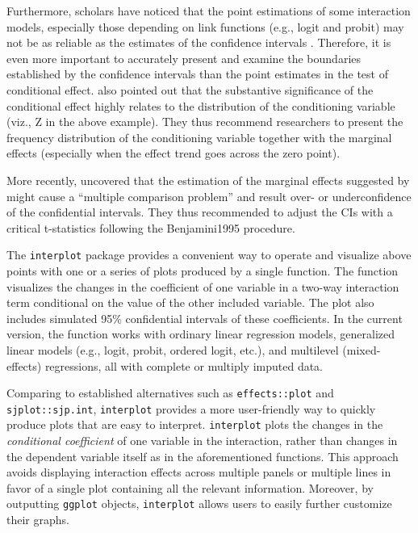 \documentclass[
  article]{jss}
\begin{document}
Furthermore, scholars have noticed that the point estimations of some
interaction models, especially those depending on link functions (e.g.,
logit and probit) may not be as reliable as the estimates of the
confidence intervals \citep{BerryDeMerittEsarey2016}. Therefore, it is
even more important to accurately present and examine the boundaries
established by the confidence intervals than the point estimates in the
test of conditional effect. \citep{BerryGolderMilton2012} also pointed
out that the substantive significance of the conditional effect highly
relates to the distribution of the conditioning variable (viz., Z in the
above example). They thus recommend researchers to present the frequency
distribution of the conditioning variable together with the marginal
effects (especially when the effect trend goes across the zero point).

More recently, \citep{EsareySumner2018}uncovered that the estimation of
the marginal effects suggested by \citep{BramborClarkGolder2006} might
cause a ``multiple comparison problem'' and result over- or
underconfidence of the confidential intervals. They thus recommended to
adjust the CIs with a critical t-statistics following the Benjamini1995
procedure.

The \texttt{interplot} package provides a convenient way to operate and
visualize above points with one or a series of plots produced by a
single function. The function visualizes the changes in the coefficient
of one variable in a two-way interaction term conditional on the value
of the other included variable. The plot also includes simulated 95\%
confidential intervals of these coefficients. In the current version,
the function works with ordinary linear regression models, generalized
linear models (e.g., logit, probit, ordered logit, etc.), and multilevel
(mixed-effects) regressions, all with complete or multiply imputed data.

Comparing to established alternatives such as \texttt{effects::plot} and
\texttt{sjplot::sjp.int}, \texttt{interplot} provides a more
user-friendly way to quickly produce plots that are easy to interpret.
\texttt{interplot} plots the changes in the \emph{conditional
coefficient} of one variable in the interaction, rather than changes in
the dependent variable itself as in the aforementioned functions. This
approach avoids displaying interaction effects across multiple panels or
multiple lines in favor of a single plot containing all the relevant
information. Moreover, by outputting \texttt{ggplot} objects,
\texttt{interplot} allows users to easily further customize their
graphs.
\end{document}
